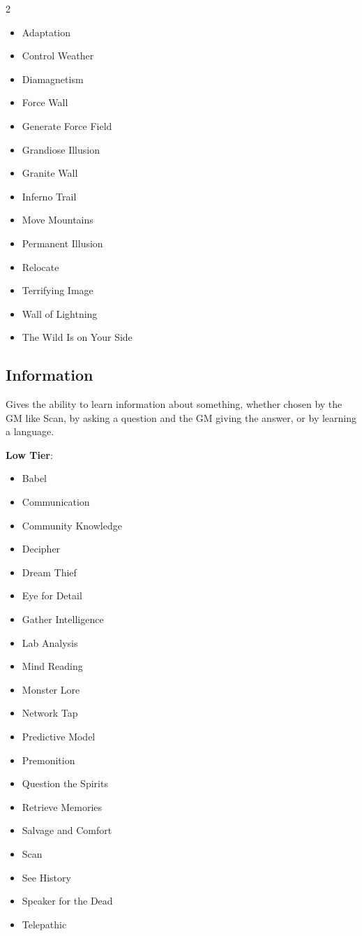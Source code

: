 \begin{multicols}{2}
\begin{itemize}
\item Adaptation
\item Control Weather
\item Diamagnetism
\item Force Wall
\item Generate Force Field
\item Grandiose Illusion
\item Granite Wall
\item Inferno Trail
\item Move Mountains
\item Permanent Illusion
\item Relocate
\item Terrifying Image
\item Wall of Lightning
\item The Wild Is on Your Side
\end{itemize}

\subsection{Information}

Gives the ability to learn information about something, whether chosen by the GM like Scan, by asking a question and the GM giving the answer, or by learning a language.

\textbf{Low Tier}:

\begin{itemize}
\item Babel
\item Communication
\item Community Knowledge
\item Decipher
\item Dream Thief
\item Eye for Detail
\item Gather Intelligence
\item Lab Analysis
\item Mind Reading
\item Monster Lore
\item Network Tap
\item Predictive Model
\item Premonition
\item Question the Spirits
\item Retrieve Memories
\item Salvage and Comfort
\item Scan
\item See History
\item Speaker for the Dead
\item Telepathic
\end{itemize}


\end{multicols}
